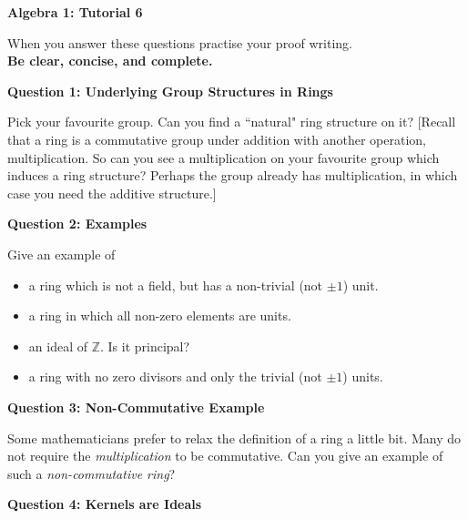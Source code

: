 \documentclass[11pt,twoside, a4paper]{report}
\theoremstyle{plain}
\theoremstyle{definition}
\begin{document}
\begin{center}
 \noindent\makebox[\linewidth]{\rule{14cm}{1.5pt}} 
{\bf Algebra 1: Tutorial 6 }
 \noindent\makebox[\linewidth]{\rule{14cm}{1.5pt}}  
 \noindent\makebox[\linewidth]{\rule{14cm}{3pt}}
\end{center}

\noindent When you answer these questions practise your proof writing.\\
  {\bf Be clear, concise, and complete.}
  
  
\begin{center}
{\bf Question 1: Underlying Group Structures in Rings}
\end{center}

Pick your favourite group. Can you find a ``natural" ring structure on it? [Recall that a ring is a commutative group under addition with another operation, multiplication. So can you see a multiplication on your favourite group which induces a ring structure? Perhaps the group already has multiplication, in which case you need the additive structure.]


  
\begin{center}
{\bf Question 2: Examples}
\end{center}

Give an example of 
\begin{itemize} 

\item a ring which is not a field, but has a non-trivial (not $\pm 1$) unit.
\item a ring in which all non-zero elements are units. 
\item an ideal of $\mathbb{Z}$. Is it principal?
\item a ring with no zero divisors and only the trivial (not $\pm 1$) units.
\end{itemize}
  
\begin{center}
{\bf Question 3: Non-Commutative Example}
\end{center}

Some mathematicians prefer to relax the definition of a ring a little bit. Many do not require the \emph{multiplication} to be commutative. Can you give an example of such a \emph{non-commutative ring}?
  
\begin{center}
{\bf Question 4: Kernels are Ideals}
\end{center} 
\end{document}

